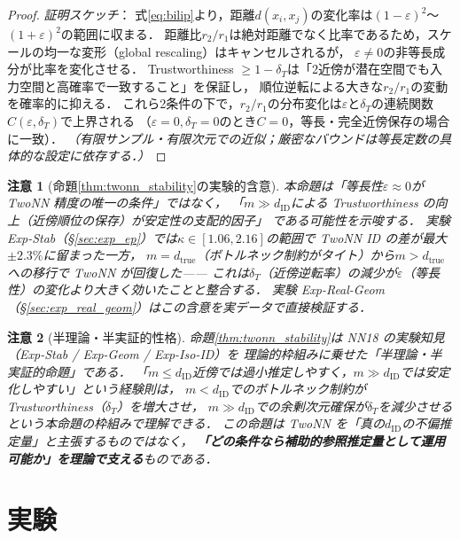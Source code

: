 \documentclass[11pt,a4paper]{jsarticle}
\newtheorem{remark}{注意}
\newcommand{\kap}{\kappa}
\begin{document}
\begin{proof}
\textit{証明スケッチ}：
式\eqref{eq:bilip}より，距離$d(x_i, x_j)$の変化率は$(1-\varepsilon)^2$〜$(1+\varepsilon)^2$の範囲に収まる．
距離比$r_2/r_1$は絶対距離でなく比率であるため，スケールの均一な変形（global rescaling）はキャンセルされるが，
$\varepsilon \neq 0$の非等長成分が比率を変化させる．
Trustworthiness $\geq 1-\delta_T$は「2近傍が潜在空間でも入力空間と高確率で一致すること」を保証し，
順位逆転による大きな$r_2/r_1$の変動を確率的に抑える．
これら2条件の下で，$r_2/r_1$の分布変化は$\varepsilon$と$\delta_T$の連続関数$C(\varepsilon,\delta_T)$で上界される
（$\varepsilon=0, \delta_T=0$のとき$C=0$，等長・完全近傍保存の場合に一致）．
\textit{（有限サンプル・有限次元での近似；厳密なバウンドは等長定数の具体的な設定に依存する．）}
\end{proof}

\begin{remark}[命題\ref{thm:twonn_stability}の実験的含意]
本命題は「等長性$\varepsilon \approx 0$が TwoNN 精度の唯一の条件」ではなく，
「$m \gg d_\mathrm{ID}$による Trustworthiness の向上（近傍順位の保存）が安定性の支配的因子」
である可能性を示唆する．
実験 Exp-Stab（§\ref{sec:exp_ep}）では$\kap \in [1.06, 2.16]$の範囲で TwoNN ID の差が最大$\pm 2.3\%$に留まった一方，
$m = d_\mathrm{true}$（ボトルネック制約がタイト）から$m > d_\mathrm{true}$への移行で TwoNN が回復した——
これは$\delta_T$（近傍逆転率）の減少が$\varepsilon$（等長性）の変化より大きく効いたことと整合する．
実験 Exp-Real-Geom（§\ref{sec:exp_real_geom}）はこの含意を実データで直接検証する．
\end{remark}

\begin{remark}[半理論・半実証的性格]
命題\ref{thm:twonn_stability}は NN18 の実験知見（Exp-Stab / Exp-Geom / Exp-Iso-ID）を
理論的枠組みに乗せた「半理論・半実証的命題」である．
「$m \leq d_\mathrm{ID}$近傍では過小推定しやすく，$m \gg d_\mathrm{ID}$では安定化しやすい」という経験則は，
$m < d_\mathrm{ID}$でのボトルネック制約が Trustworthiness（$\delta_T$）を増大させ，
$m \gg d_\mathrm{ID}$での余剰次元確保が$\delta_T$を減少させるという本命題の枠組みで理解できる．
この命題は TwoNN を「真の$d_\mathrm{ID}$の不偏推定量」と主張するものではなく，
\textbf{「どの条件なら補助的参照推定量として運用可能か」を理論で支える}ものである．
\end{remark}

\section{実験}\label{sec:exp}
\end{document}
